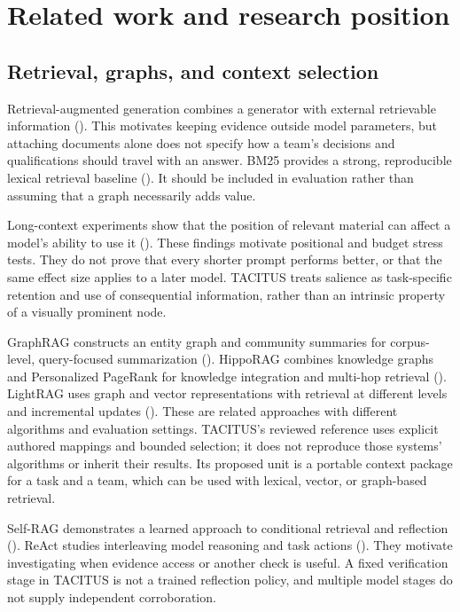 \documentclass[
  11pt,
]{article}
\let\originalsection\section
\renewcommand{\section}{\Needspace{5\baselineskip}\originalsection}
\begin{document}
\section{Related work and research
position}\label{related-work-and-research-position}

\subsection{Retrieval, graphs, and context
selection}\label{retrieval-graphs-and-context-selection}

Retrieval-augmented generation combines a generator with external
retrievable information ().
This motivates keeping evidence outside model parameters, but attaching
documents alone does not specify how a team's decisions and
qualifications should travel with an answer. BM25 provides a strong,
reproducible lexical retrieval baseline
(). It should
be included in evaluation rather than assuming that a graph necessarily
adds value.

Long-context experiments show that the position of relevant material can
affect a model's ability to use it (). These findings motivate positional and budget stress tests. They
do not prove that every shorter prompt performs better, or that the same
effect size applies to a later model. TACITUS treats salience as
task-specific retention and use of consequential information, rather
than an intrinsic property of a visually prominent node.

GraphRAG constructs an entity graph and community summaries for
corpus-level, query-focused summarization (). HippoRAG combines knowledge graphs and Personalized
PageRank for knowledge integration and multi-hop retrieval
(). LightRAG
uses graph and vector representations with retrieval at different levels
and incremental updates (). These
are related approaches with different algorithms and evaluation
settings. TACITUS's reviewed reference uses explicit authored mappings
and bounded selection; it does not reproduce those systems' algorithms
or inherit their results. Its proposed unit is a portable context
package for a task and a team, which can be used with lexical, vector,
or graph-based retrieval.

Self-RAG demonstrates a learned approach to conditional retrieval and
reflection (). ReAct studies
interleaving model reasoning and task actions
(). They motivate investigating
when evidence access or another check is useful. A fixed verification
stage in TACITUS is not a trained reflection policy, and multiple model
stages do not supply independent corroboration.
\end{document}
